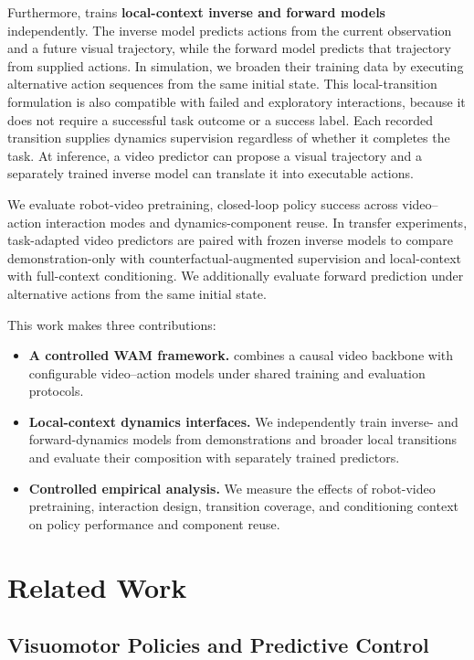 Furthermore, \ours trains \textbf{local-context inverse and forward models} independently. The inverse model predicts actions from the current observation and a future visual trajectory, while the forward model predicts that trajectory from supplied actions.
In simulation, we broaden their training data by executing alternative action sequences from the same initial state.
This local-transition formulation is also compatible with failed and exploratory interactions, because it does not require a successful task outcome or a success label.
Each recorded transition supplies dynamics supervision regardless of whether it completes the task. At inference, a video predictor can propose a visual trajectory and a separately trained inverse model can translate it into executable actions.

We evaluate robot-video pretraining, closed-loop policy success across
video--action interaction modes and dynamics-component reuse. In transfer experiments, task-adapted video predictors are paired with frozen inverse models to compare demonstration-only with counterfactual-augmented supervision and local-context with full-context conditioning. We additionally evaluate forward prediction under alternative actions from the same initial state.

This work makes three contributions:
\begin{itemize}
  \item \textbf{A controlled WAM framework.} \ours combines a causal video backbone with configurable video--action models under shared training and evaluation protocols.
  \item \textbf{Local-context dynamics interfaces.} We independently train inverse- and forward-dynamics models from demonstrations and broader local transitions and evaluate their composition with separately trained predictors.
  \item \textbf{Controlled empirical analysis.} We measure the effects of robot-video pretraining, interaction design, transition coverage, and conditioning context on policy performance and component reuse.
\end{itemize}

\section{Related Work}
\label{sec:related}

\subsection{Visuomotor Policies and Predictive Control}

